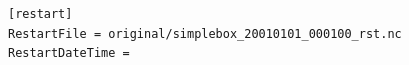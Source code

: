 \texttt{[restart]}  \\
\texttt{RestartFile                        =  original/simplebox\_20010101\_000100\_rst.nc}  \\
\texttt{RestartDateTime                    =  }